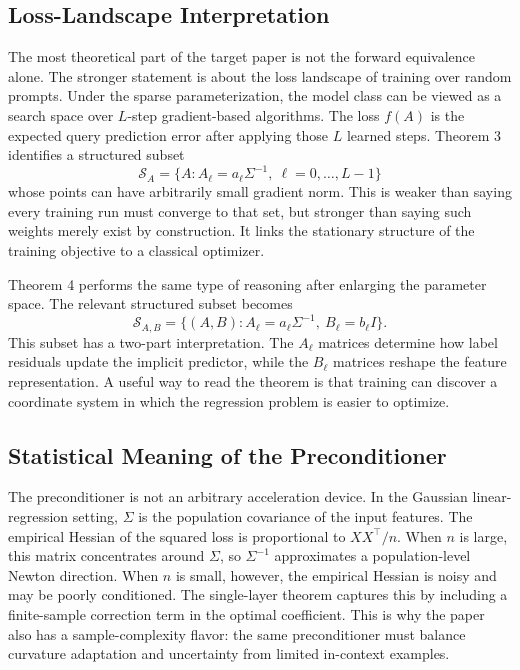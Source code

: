 \documentclass[conference]{IEEEtran}
\begin{document}
\subsection{Loss-Landscape Interpretation}
The most theoretical part of the target paper is not the forward equivalence alone. The stronger statement is about the loss landscape of training over random prompts. Under the sparse parameterization, the model class can be viewed as a search space over $L$-step gradient-based algorithms. The loss $f(A)$ is the expected query prediction error after applying those $L$ learned steps. Theorem 3 identifies a structured subset
\begin{equation}
\mathcal{S}_A=\{A: A_\ell=a_\ell\Sigma^{-1},\ \ell=0,\ldots,L-1\}
\end{equation}
whose points can have arbitrarily small gradient norm. This is weaker than saying every training run must converge to that set, but stronger than saying such weights merely exist by construction. It links the stationary structure of the training objective to a classical optimizer.

Theorem 4 performs the same type of reasoning after enlarging the parameter space. The relevant structured subset becomes
\begin{equation}
\mathcal{S}_{A,B}=\{(A,B):A_\ell=a_\ell\Sigma^{-1},\ B_\ell=b_\ell I\}.
\end{equation}
This subset has a two-part interpretation. The $A_\ell$ matrices determine how label residuals update the implicit predictor, while the $B_\ell$ matrices reshape the feature representation. A useful way to read the theorem is that training can discover a coordinate system in which the regression problem is easier to optimize.

\subsection{Statistical Meaning of the Preconditioner}
The preconditioner is not an arbitrary acceleration device. In the Gaussian linear-regression setting, $\Sigma$ is the population covariance of the input features. The empirical Hessian of the squared loss is proportional to $XX^\top/n$. When $n$ is large, this matrix concentrates around $\Sigma$, so $\Sigma^{-1}$ approximates a population-level Newton direction. When $n$ is small, however, the empirical Hessian is noisy and may be poorly conditioned. The single-layer theorem captures this by including a finite-sample correction term in the optimal coefficient. This is why the paper also has a sample-complexity flavor: the same preconditioner must balance curvature adaptation and uncertainty from limited in-context examples.
\end{document}

